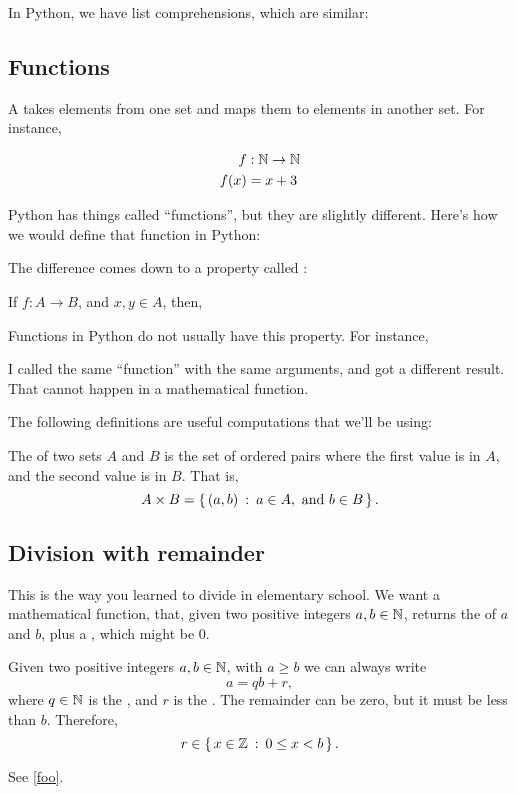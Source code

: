 In Python, we have list comprehensions, which are similar:


\subsection{Functions}

A  takes elements from one set and maps
them to elements in another set. For instance,

\begin{align*}
  f & : \mathbb{N} \to \mathbb{N} \\
  f(x) & = x + 3
\end{align*}

Python has things called ``functions'', but they are slightly
different. Here's how we would define that function in Python:


The difference comes down to a property called :

\begin{axiom}
  \label{foo}
  If $f : A \to B$, and $x, y \in A$, then, 
\end{axiom}

Functions in Python do not usually have this property. For instance,


I called the same ``function'' with the same arguments, and got a
different result. That cannot happen in a mathematical function.

The following definitions are useful computations that we'll be using:

\begin{definition}
  The  of two sets $A$ and $B$ is the set of
  ordered pairs where the first value is in $A$, and the second value
  is in $B$. That is,
  $$A \times B = \left\{\, (a, b) \::\: a \in A, \text{ and } b \in B \,\right\}.$$
\end{definition}

\begin{definition}
    
\end{definition}

\subsection{Division with remainder}

This is the way you learned to divide in elementary school. We want a
mathematical function, that, given two positive integers $a, b \in
\mathbb{N}$, returns the  of $a$ and $b$, plus a
, which might be $0$.

\begin{lemma}
  Given two positive integers $a, b \in \mathbb{N}$, with $a \ge b$ we can
  always write $$a = qb + r,$$ where $q \in \mathbb{N}$ is the
  , and $r$ is the . The remainder can
  be zero, but it must be less than $b$. Therefore,
  $$r \in \left\{\, x \in \mathbb{Z} \::\: 0 \le x < b \,\right\}.$$
\end{lemma}


See \cref{foo}.